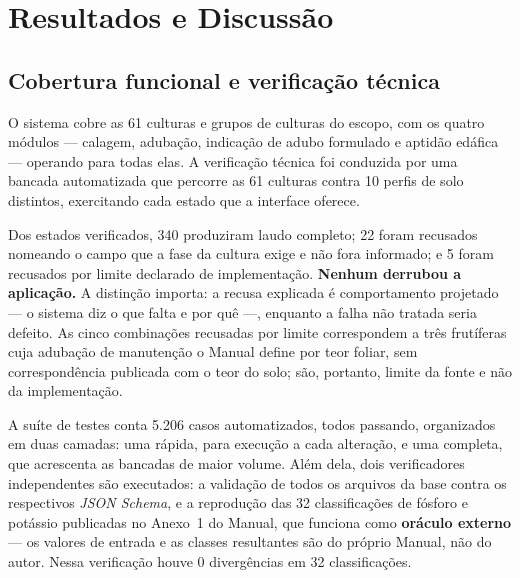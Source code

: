 %
%
%

\chapter{Resultados e Discussão}\label{chap:resultados}

\section{Cobertura funcional e verificação técnica}

O sistema cobre as 61 culturas e grupos de culturas do escopo, com os quatro módulos ---
calagem, adubação, indicação de adubo formulado e aptidão edáfica --- operando para
todas elas. A verificação técnica foi conduzida por uma bancada automatizada que percorre
as 61 culturas contra 10 perfis de solo distintos, exercitando cada estado que a interface
oferece.

Dos estados verificados, 340 produziram laudo completo; 22 foram recusados nomeando o
campo que a fase da cultura exige e não fora informado; e 5 foram recusados por limite
declarado de implementação. \textbf{Nenhum derrubou a aplicação.} A distinção importa: a
recusa explicada é comportamento projetado --- o sistema diz o que falta e por quê ---,
enquanto a falha não tratada seria defeito. As cinco combinações recusadas por limite
correspondem a três frutíferas cuja adubação de manutenção o Manual define por teor
foliar, sem correspondência publicada com o teor do solo; são, portanto, limite da fonte
e não da implementação.

A suíte de testes conta 5.206 casos automatizados, todos passando, organizados em duas
camadas: uma rápida, para execução a cada alteração, e uma completa, que acrescenta as
bancadas de maior volume. Além dela, dois verificadores independentes são executados: a
validação de todos os arquivos da base contra os respectivos \textit{JSON Schema}, e a
reprodução das 32 classificações de fósforo e potássio publicadas no Anexo~1 do Manual,
que funciona como \textbf{oráculo externo} --- os valores de entrada e as classes
resultantes são do próprio Manual, não do autor. Nessa verificação houve 0 divergências
em 32 classificações.

